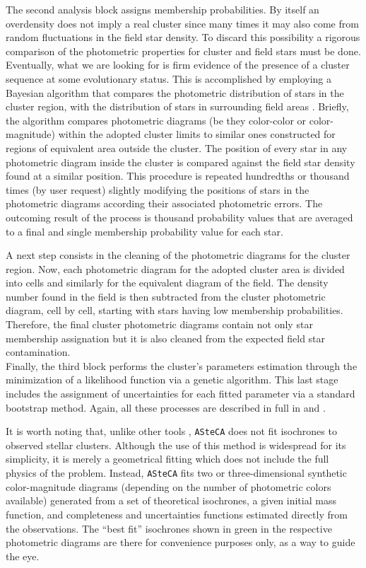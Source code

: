 \documentclass{aa}
\begin{document}
The second analysis block assigns membership probabilities. By
itself an overdensity does not imply a real cluster since many times it may also
come from random fluctuations in the field star density. To discard this
possibility a rigorous comparison of the photometric
properties for cluster and field stars must be done. Eventually, what we
are looking for is firm evidence of the presence of a cluster sequence at some
evolutionary status. This is accomplished by employing a Bayesian algorithm that
compares the photometric distribution of stars in the cluster region, with the
distribution of stars in surrounding field areas \citep{Perren_2015}. Briefly,
the algorithm compares photometric diagrams (be they color-color or
color-magnitude) within the adopted cluster limits to similar ones constructed
for regions of equivalent area outside the cluster. The position of every star
in any photometric diagram inside the cluster is compared against the field
star density found at a similar position. This procedure is repeated hundredths
or thousand times (by user request) slightly modifying the positions of stars
in the photometric diagrams according their associated photometric errors. The
outcoming result of the process is thousand probability values that are
averaged to a final and single membership probability value for each star.

A next step consists in the cleaning of the photometric diagrams for the cluster
region. Now, each photometric diagram for the adopted cluster area is divided
into cells and similarly for the equivalent diagram of the field. The
density number found in the field is then subtracted from the cluster
photometric diagram, cell by cell, starting with stars having low membership
probabilities. Therefore, the final cluster photometric diagrams contain not
only star membership assignation but it is also cleaned from the expected field
star contamination.\\

Finally, the third block performs the cluster's parameters estimation through
the minimization of a likelihood function via a genetic algorithm. This last
stage includes the assignment of uncertainties for each fitted parameter via a
standard bootstrap method. Again, all these processes are described in full in
\cite{Perren_2015} and \cite{Perren_2017}.

It is worth noting that, unlike other tools \citep[e.g.:][]{Yen_2018},
\texttt{ASteCA} does not fit isochrones to observed stellar clusters. Although
the use of this method is widespread for its simplicity, it is merely a
geometrical fitting which does not include the full physics of the problem.
Instead, \texttt{ASteCA} fits two or three-dimensional synthetic
color-magnitude diagrams (depending on the number of photometric colors
available) generated from a set of theoretical isochrones, a given initial mass
function, and completeness and uncertainties functions estimated directly from
the observations. The ``best fit'' isochrones shown in green in the respective
photometric diagrams are there for convenience purposes only, as a way to guide
the eye.
\end{document}
